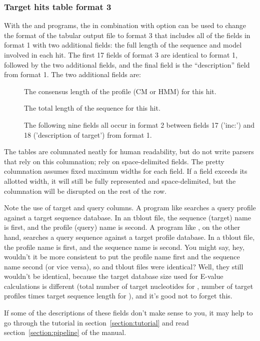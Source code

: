 \subsubsection{Target hits table format 3}
\label{tabular-format3}

With the  and  programs, the  
in combination with  option can be used to change
the format of the tabular output file to format 3 that includes all of
the fields in format 1 with two additional fields: the full length of
the sequence and model involved in each hit. The first 17 fields of
format 3 are identical to format 1, followed by the two additional
fields, and the final field is the ``description'' field from format
1. The two additional fields are:

\begin{description}

\item[]
The consensus length of the profile (CM or HMM) for this hit.

\item[]
The total length of the sequence for this hit.

The following nine fields all occur in format 2 between fields 17
('inc:') and 18 ('description of target') from format 1. 

\end{description}

The tables are columnated neatly for human readability, but do not
write parsers that rely on this columnation; rely on space-delimited
fields. The pretty columnation assumes fixed maximum widths for each
field. If a field exceeds its allotted width, it will still be fully
represented and space-delimited, but the columnation will be disrupted
on the rest of the row.

Note the use of target and query columns. A program like
 searches a query profile against a target sequence
database. In an  tblout file, the sequence (target)
name is first, and the profile (query) name is second. A program like
, on the other hand, searches a query sequence against a
target profile database. In a  tblout file, the profile
name is first, and the sequence name is second. You might say, hey,
wouldn't it be more consistent to put the profile name first and the
sequence name second (or vice versa), so  and
 tblout files were identical? Well, they
still wouldn't be identical, because the target database size used for
E-value calculations is different (total number of target nucleotides
for , number of target profiles times target sequence
length for ), and it's good not to forget this.

If some of the descriptions of these fields don't make sense to you,
it may help to go through the tutorial in
section~\ref{section:tutorial} and read section~\ref{section:pipeline}
of the manual. 

